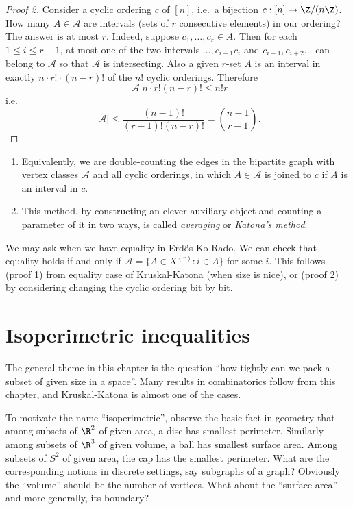 \documentclass[a4paper]{article}
\begin{document}
\begin{proof}[Proof 2]
  Consider a cyclic ordering \(c\) of \([n]\), i.e.\ a bijection \(c: [n] \to \Z/(n\Z)\). How many \(A \in \mathcal A\) are intervals (sets of \(r\) consecutive elements) in our ordering? The answer is at most \(r\). Indeed, suppose \(c_1, \dots, c_r \in A\). Then for each \(1 \leq i \leq r - 1\), at most one of the two intervals \(\dots, c_{i - 1} c_i\) and \(c_{i + 1}, c_{i + 2} \dots\) can belong to \(\mathcal A\) so that \(\mathcal A\) is intersecting. Also a given \(r\)-set \(A\) is an interval in exactly \(n \cdot r! \cdot (n - r)!\) of the \(n!\) cyclic orderings. Therefore
  \[
    |\mathcal A| n \cdot r! (n - r)! \leq n! r
  \]
  i.e.
  \[
    |\mathcal A| \leq \frac{(n - 1)!}{(r - 1)! (n - r)!} = \binom{n - 1}{r - 1}.
  \]
\end{proof}

\begin{remark}\leavevmode
  \begin{enumerate}
  \item Equivalently, we are double-counting the edges in the bipartite graph with vertex classes \(\mathcal A\) and all cyclic orderings, in which \(A \in \mathcal A\) is joined to \(c\) if \(A\) is an interval in \(c\).
  \item This method, by constructing an clever auxiliary object and counting a parameter of it in two ways, is called \emph{averaging} or \emph{Katona's method}.
  \end{enumerate}
\end{remark}

We may ask when we have equality in Erdős-Ko-Rado. We can check that equality holds if and only if \(\mathcal A = \{A \in X^{(r)}: i \in A\}\) for some \(i\). This follows (proof 1) from equality case of Kruskal-Katona (when size is nice), or (proof 2) by considering changing the cyclic ordering bit by bit.

\section{Isoperimetric inequalities}

The general theme in this chapter is the question ``how tightly can we pack a subset of given size in a space''. Many results in combinatorics follow from this chapter, and Kruskal-Katona is almost one of the cases.

To motivate the name ``isoperimetric'', observe the basic fact in geometry that among subsets of \(\R^2\) of given area, a disc has smallest perimeter. Similarly among subsets of \(\R^3\) of given volume, a ball has smallest surface area. Among subsets of \(S^2\) of given area, the cap has the smallest perimeter. What are the corresponding notions in discrete settings, say subgraphs of a graph? Obviously the ``volume'' should be the number of vertices. What about the ``surface area'' and more generally, its boundary?
\end{document}
